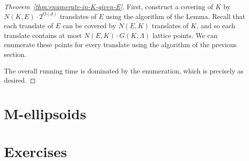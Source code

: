 \begin{proof}[Theorem~\ref{thm:enumerate-in-K-given-E}]
  First, construct a covering of $K$ by $N(K,E) \cdot 2^{O(d)}$ translates of $E$ using the algorithm of the Lemma.
  Recall that each translate of $E$ can be covered by $N(E,K)$ translates of $K$,
  and so each translate contains at most $N(E,K) \cdot G(K,\Lambda)$ lattice points.
  We can enumerate these points for every translate using the algorithm of the previous section.
  
  The overall running time is dominated by the enumeration,
  which is precisely as desired.
\end{proof}


\section{M-ellipsoids}



\section*{Exercises}

